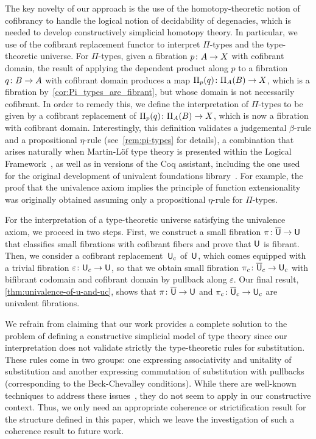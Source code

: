 \documentclass[reqno,10pt,a4paper,oneside,draft]{amsart}
\begin{document}
The key novelty of our approach is the use of the homotopy-theoretic notion of cofibrancy
to handle the logical notion of decidability of degenacies, which is needed to develop constructively simplicial homotopy theory. In particular, we use of the cofibrant  replacement functor
to interpret $\Pi$-types and the type-theoretic universe.  For $\Pi$-types, given a fibration $p \colon A \to X$ with cofibrant domain, the result of applying the dependent product along $p$ to a fibration $q \colon B \to A$ with cofibrant domain produces a map  $\Pi_p(q) \colon \Pi_A(B) \to X$, which is a fibration by~\cref{cor:Pi_types_are_fibrant}, but whose domain
is not necessarily cofibrant. In order to remedy this, we define the interpretation of $\Pi$-types to be given by a cofibrant replacement of
$\Pi_p(q) \colon \Pi_A(B) \to X$, which is now a fibration with cofibrant domain. 
Interestingly, this definition validates 
a judgemental $\beta$-rule and a propositional $\eta$-rule (see~\cref{rem:pi-types} for details), a combination that arises naturally when  Martin-L\"of type theory is presented
within the Logical Framework~\cite{nordstrom-petersson-smith:ml}, as well as in
versions of the Coq assistant, including the one used for the original development of  univalent foundations
library~\cite{voevodsky:library}. For example, the proof that the univalence axiom implies the principle of function extensionality was originally obtained assuming only a propositional $\eta$-rule for $\Pi$-types.

For the interpretation of a  type-theoretic universe satisfying the univalence axiom, we proceed
in two steps. First, we construct a small fibration $\pi \colon \overline{\mathsf{U}} \to \mathsf{U}$ that classifies small fibrations with cofibrant fibers and prove that $\mathsf{U}$ is fibrant. 
Then, we consider a cofibrant replacement~$\mathsf{U}_c$ of~$\mathsf{U}$, which comes equipped with a trivial fibration $\varepsilon \colon \mathsf{U}_c \to \mathsf{U}$, so that 
we obtain small fibration $\pi_c \colon \overline{\mathsf{U}}_c \to \mathsf{U}_c$ with bifibrant codomain and cofibrant domain by pullback along $\varepsilon$. Our final result, \cref{thm:univalence-of-u-and-uc}, shows that
$\pi \colon \overline{\mathsf{U}} \to \mathsf{U}$ and $\pi_c \colon \overline{\mathsf{U}}_c \to \mathsf{U}_c$ are univalent fibrations. 



We refrain from claiming that our work provides a complete solution to the problem of defining a constructive simplicial model of type theory since our interpretation  does not validate strictly the type-theoretic
rules for substitution. These rules come in two groups:
one expressing associativity and unitality of substitution and another expressing commutation of substitution with pullbacks (corresponding to the Beck-Chevalley conditions). While 
there are well-known techniques to address these issues~\cite{voevodsky-simplicial-model,LumsdaineP:locuoc}, they do not seem to apply in our constructive context.
Thus, we only need an appropriate coherence or strictification result for the structure defined in this paper, 
which we leave the investigation of such a coherence result to future work.
\end{document}
